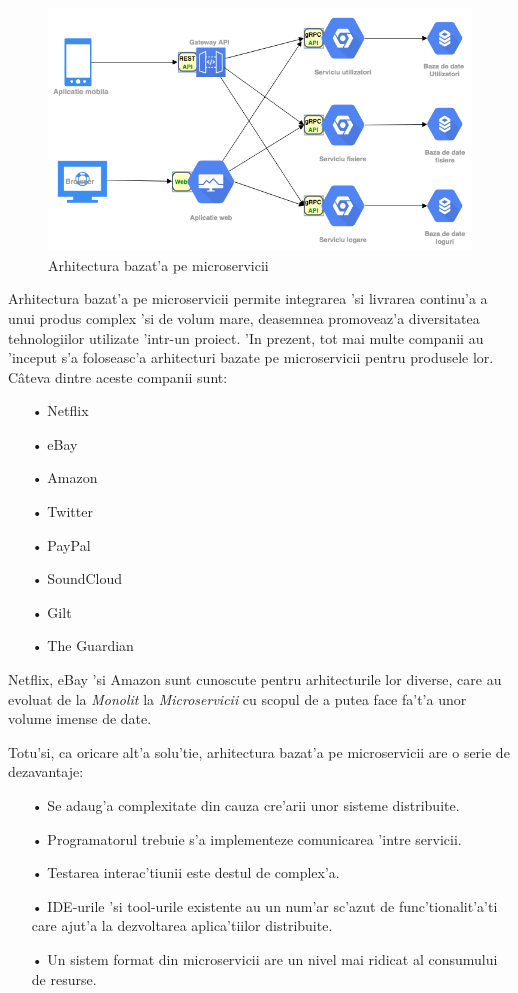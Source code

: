 \documentclass[12pt,a4paper,twoside]{report}
\begin{document}
\begin{figure}[H]
\begin{center}
\advance\leftskip-3cm
\advance\rightskip-3cm
\includegraphics[keepaspectratio=true,scale=0.55]{img/Microservice_Architecture.png}
\caption{Arhitectura bazat'a pe microservicii}
\label{microservices_arch}
\end{center}
\end{figure}

Arhitectura bazat'a pe microservicii permite integrarea 'si livrarea continu'a a unui produs complex 'si de volum mare, deasemnea promoveaz'a diversitatea tehnologiilor utilizate 'intr-un proiect.
'In prezent, tot mai multe companii au 'inceput s'a foloseasc'a arhitecturi bazate pe microservicii pentru produsele lor. Câteva dintre aceste companii sunt\cite{microservice_companies}:
\begin{itemize}
\item[•] Netflix
\item[•] eBay
\item[•] Amazon
\item[•] Twitter
\item[•] PayPal
\item[•] SoundCloud
\item[•] Gilt
\item[•] The Guardian
\end{itemize}
Netflix, eBay 'si Amazon sunt cunoscute pentru arhitecturile lor diverse, care au evoluat de la \textit{Monolit} la \textit{Microservicii} cu scopul de a putea face fa't'a unor volume imense de date.

Totu'si, ca oricare alt'a solu'tie, arhitectura bazat'a pe microservicii are o serie de dezavantaje\cite{microservices_io}:
\begin{itemize}
\item[•] Se adaug'a complexitate din cauza cre'arii unor sisteme distribuite.
\item[•] Programatorul trebuie s'a implementeze comunicarea 'intre servicii.
\item[•] Testarea interac'tiunii este destul de complex'a.
\item[•] IDE-urile 'si tool-urile existente au un num'ar sc'azut de  func'tionalit'a'ti care ajut'a la dezvoltarea aplica'tiilor distribuite.
\item[•] Un sistem format din microservicii are un nivel mai ridicat al consumului de resurse.
\end{itemize}
\end{document}
